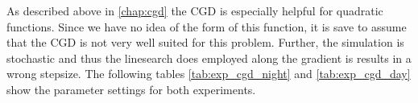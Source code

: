 \documentclass[./\jobname.tex]{subfiles}
\begin{document}
As described above in \ref{chap:cgd} the CGD is especially helpful for quadratic functions. Since we have no idea of the form of this function, it is save to assume that the CGD is not very well suited for this problem. Further, the simulation is stochastic and thus the linesearch does employed along the gradient is results in a wrong stepsize. The following tables \ref{tab:exp_cgd_night} and \ref{tab:exp_cgd_day} show the parameter settings for both experiments. 

\begin{table}[H]
	\centering
	\noindent{}
	\label{tab:exp_cgd_night}
\end{table}
\end{document}
